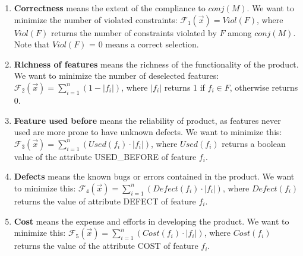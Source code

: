 \begin{enumerate}[label=\textbf{Obj\arabic*.},itemindent=*]
  \item \textbf{Correctness} means the extent of the compliance to $conj(M)$. We want to minimize the number of violated constraints:  $\mathcal{F}_1(\vec x) = Viol(F)$, where $Viol(F)$ returns the number of constraints violated by $F$ among $conj(M)$. Note that $Viol(F)$ = 0 means a  correct selection.
  \item  \textbf{Richness of features} means the richness of the functionality of the product. We want to minimize the number of deselected features: $\mathcal{F}_2(\vec x) = \sum\nolimits_{i=1}^{n} (1-|f_i|)$, where $|f_i|$ returns 1 if $f_i \in F$, otherwise returns 0.
  \item   \textbf{Feature used before} means the reliability of product, as features never used are more prone to have unknown defects. We want to minimize this:
      $  \mathcal{F}_3(\vec x) = \sum\nolimits_{i=1}^{n} (Used(f_i)  \cdot  |f_i|)$, where $Used(f_i)$ returns a boolean value of the attribute USED\_BEFORE of feature $f_i$.
   \item \textbf{Defects} means the known bugs or errors contained in the product. We want to minimize this: %
       $\mathcal{F}_4(\vec x) =  \sum\nolimits_{i=1}^{n}( Defect(f_i)   \cdot  |f_i|)$, where $Defect(f_i)$ returns the value of attribute DEFECT of feature $f_i$.
  \item  \textbf{Cost} means the expense and efforts in developing the product. We want to minimize this: $\mathcal{F}_5(\vec x) = \sum\nolimits_{i=1}^{n}( Cost(f_i)  \cdot   |f_i|)$, where  $Cost(f_i)$ returns the value of the attribute COST of feature $f_i$.
\end{enumerate}

